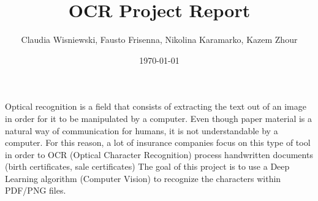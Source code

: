\documentclass[fontsize=12pt, paper=book, DIV=calc]{scrbook}
\title{OCR Project Report}
\author{Claudia Wisniewski, Fausto Frisenna, Nikolina Karamarko, Kazem Zhour}
\date{\today}
\begin{document}
\maketitle

\tableofcontents
\newpage
Optical recognition is a field that consists of extracting the text out of an image in order for it to be manipulated by a computer. Even though paper material is a natural way of communication for humans, it is not understandable by a computer. For this reason, a lot of insurance companies focus on this type of tool in order to OCR (Optical Character Recognition) process handwritten documents (birth certificates, sale certificates)
The goal of this project is to use a Deep Learning algorithm (Computer Vision) to recognize the characters within PDF/PNG files.

\printbibliography
\end{document}
